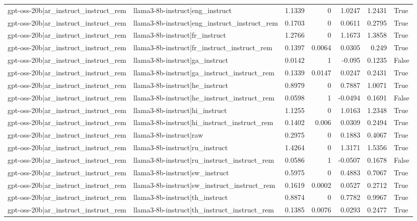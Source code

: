 \begin{table}
\begin{tabular}{l l r r r r l}
gpt-oss-20b|ar_instruct_instruct_rem & llama3-8b-instruct|eng_instruct & 1.1339 & 0 & 1.0247 & 1.2431 & True \\
gpt-oss-20b|ar_instruct_instruct_rem & llama3-8b-instruct|eng_instruct_instruct_rem & 0.1703 & 0 & 0.0611 & 0.2795 & True \\
gpt-oss-20b|ar_instruct_instruct_rem & llama3-8b-instruct|fr_instruct & 1.2766 & 0 & 1.1673 & 1.3858 & True \\
gpt-oss-20b|ar_instruct_instruct_rem & llama3-8b-instruct|fr_instruct_instruct_rem & 0.1397 & 0.0064 & 0.0305 & 0.249 & True \\
gpt-oss-20b|ar_instruct_instruct_rem & llama3-8b-instruct|ga_instruct & 0.0142 & 1 & -0.095 & 0.1235 & False \\
gpt-oss-20b|ar_instruct_instruct_rem & llama3-8b-instruct|ga_instruct_instruct_rem & 0.1339 & 0.0147 & 0.0247 & 0.2431 & True \\
gpt-oss-20b|ar_instruct_instruct_rem & llama3-8b-instruct|he_instruct & 0.8979 & 0 & 0.7887 & 1.0071 & True \\
gpt-oss-20b|ar_instruct_instruct_rem & llama3-8b-instruct|he_instruct_instruct_rem & 0.0598 & 1 & -0.0494 & 0.1691 & False \\
gpt-oss-20b|ar_instruct_instruct_rem & llama3-8b-instruct|hi_instruct & 1.1255 & 0 & 1.0163 & 1.2348 & True \\
gpt-oss-20b|ar_instruct_instruct_rem & llama3-8b-instruct|hi_instruct_instruct_rem & 0.1402 & 0.006 & 0.0309 & 0.2494 & True \\
gpt-oss-20b|ar_instruct_instruct_rem & llama3-8b-instruct|raw & 0.2975 & 0 & 0.1883 & 0.4067 & True \\
gpt-oss-20b|ar_instruct_instruct_rem & llama3-8b-instruct|ru_instruct & 1.4264 & 0 & 1.3171 & 1.5356 & True \\
gpt-oss-20b|ar_instruct_instruct_rem & llama3-8b-instruct|ru_instruct_instruct_rem & 0.0586 & 1 & -0.0507 & 0.1678 & False \\
gpt-oss-20b|ar_instruct_instruct_rem & llama3-8b-instruct|sw_instruct & 0.5975 & 0 & 0.4883 & 0.7067 & True \\
gpt-oss-20b|ar_instruct_instruct_rem & llama3-8b-instruct|sw_instruct_instruct_rem & 0.1619 & 0.0002 & 0.0527 & 0.2712 & True \\
gpt-oss-20b|ar_instruct_instruct_rem & llama3-8b-instruct|th_instruct & 0.8874 & 0 & 0.7782 & 0.9967 & True \\
gpt-oss-20b|ar_instruct_instruct_rem & llama3-8b-instruct|th_instruct_instruct_rem & 0.1385 & 0.0076 & 0.0293 & 0.2477 & True \\

\end{tabular}
\end{table}
